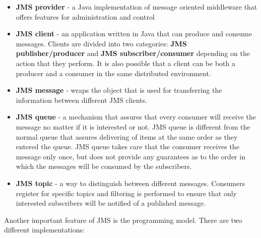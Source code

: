 \documentclass{sigplanconf}
\begin{document}
\begin{itemize} \itemsep1pt \parskip0pt 

\item \textbf{JMS provider} - a Java implementation of message oriented middleware that offers features for administration and control
\item \textbf{JMS client} - an application written in Java that can produce and consume messages. Clients are divided into two categories: \textbf{JMS publisher/producer} and \textbf{JMS subscriber/consumer} depending on the action that they perform. It is also possible that a client can be both a producer and a consumer in the same distributed environment.
\item \textbf{JMS message} - wraps the object that is used for transferring the information between different JMS clients.
\item \textbf{JMS queue} - a mechanism that assures that every consumer will receive the message no matter if it is interested or not. JMS queue is different from the normal queue that assures delivering of items at the same order as they entered the queue. JMS queue takes care that the consumer receives the message only once, but does not provide any guarantees as to the order in which the messages will be consumed by the subscribers.
\item \textbf{JMS topic} - a way to distinguish between different messages. Consumers register for specific topics and  filtering is performed to ensure that only interested subscribers will be notified of a published message.

\end{itemize}

Another important feature of JMS is the programming model. There are two different implementations:
\end{document}
